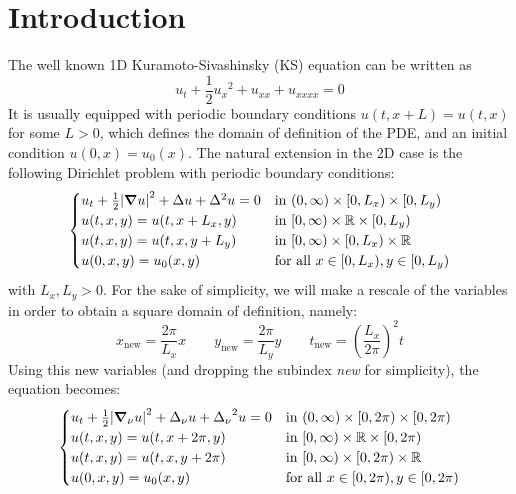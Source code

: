 \documentclass[twoside]{article}
\begin{document}
\section{Introduction}
The well known 1D Kuramoto-Sivashinsky (KS) equation can be written as
\begin{equation}
  u_t + \frac{1}{2} {u_x}^2 + u_{xx} + u_{xxxx} = 0
\end{equation}
It is usually equipped with periodic boundary conditions $u(t, x + L) = u(t, x)$ for some $L > 0$, which defines the domain of definition of the PDE, and an initial condition $u(0, x) = u_0(x)$. The natural extension in the 2D case is the following Dirichlet problem with periodic boundary conditions:
\begin{equation}
  \begin{cases}
    u_t + \frac{1}{2} \abs{\grad u}^2 + \Delta u + \Delta^2 u = 0 & \text{in } (0, \infty) \times [0, L_x) \times [0, L_y) \\
    u(t, x, y) = u(t, x + L_x, y)                                         & \text{in } [0, \infty) \times \mathbb{R} \times [0, L_y)      \\
    u(t, x, y) = u(t, x, y + L_y)                                         & \text{in } [0, \infty) \times [0, L_x) \times \mathbb{R}      \\
    u(0, x, y) = u_0(x, y)                                                & \text{for all } x \in [0, L_x), y \in [0, L_y)
  \end{cases}
\end{equation}
with $L_x, L_y > 0$. For the sake of simplicity, we will make a rescale of the variables in order to obtain a square domain of definition, namely:
\begin{equation}
  x_\mathrm{new} = \frac{2\pi}{L_x} x \qquad y_\mathrm{new} = \frac{2\pi}{L_y} y \qquad t_\mathrm{new} = {\left(\frac{L_x}{2 \pi}\right)}^2 t
\end{equation}
Using this new variables (and dropping the subindex \emph{new} for simplicity), the equation becomes:
\begin{equation}\label{eq:2d_ks}
  \begin{cases}
    u_t + \frac{1}{2} \abs{\grad_\nu u}^2 + \Delta_\nu u + {\Delta_\nu}^2 u = 0 & \text{in } (0, \infty) \times [0, 2\pi) \times [0, 2\pi) \\
    u(t, x, y) = u(t, x + 2\pi, y)                                                      & \text{in } [0, \infty) \times \mathbb{R} \times [0, 2\pi)       \\
    u(t, x, y) = u(t, x, y + 2\pi)                                                      & \text{in } [0, \infty) \times [0, 2\pi) \times \mathbb{R}       \\
    u(0, x, y) = u_0(x, y)                                                              & \text{for all } x \in [0, 2\pi), y \in [0, 2\pi)
  \end{cases}
\end{equation}
\end{document}
